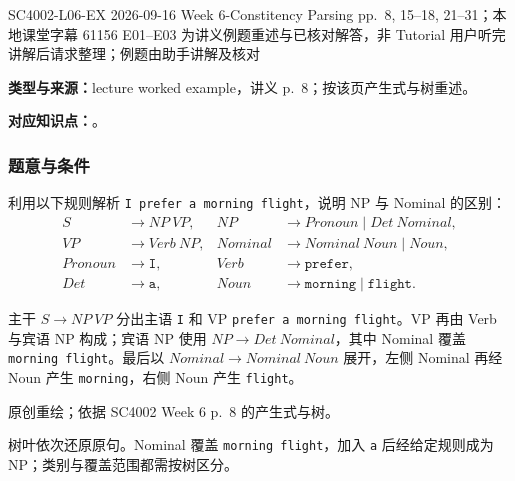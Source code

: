 

\examplemeta
  {SC4002-L06-EX}
  {2026-09-16}
  {Week 6-Constitency Parsing pp.~8, 15--18, 21--31；本地课堂字幕 61156}
  {E01--E03 为讲义例题重述与已核对解答，非 Tutorial}
  {用户听完讲解后请求整理；例题由助手讲解及核对}


\textbf{类型与来源：}lecture worked example，讲义 p.~8；按该页产生式与树重述。

\textbf{对应知识点：}。

\subsubsection*{题意与条件}

利用以下规则解析 \texttt{I prefer a morning flight}，说明 NP 与 Nominal 的区别：
\[
\begin{aligned}
  S&\rightarrow NP\ VP,& NP&\rightarrow Pronoun\mid Det\ Nominal,\\
  VP&\rightarrow Verb\ NP,& Nominal&\rightarrow Nominal\ Noun\mid Noun,\\
  Pronoun&\rightarrow\texttt{I},& Verb&\rightarrow\texttt{prefer},\\
  Det&\rightarrow\texttt{a},& Noun&\rightarrow\texttt{morning}\mid\texttt{flight}.
\end{aligned}
\]

\begin{workedsolution}
主干 $S\rightarrow NP\ VP$ 分出主语 \texttt{I} 和 VP \texttt{prefer a morning flight}。VP 再由 Verb 与宾语 NP 构成；宾语 NP 使用 $NP\rightarrow Det\ Nominal$，其中 Nominal 覆盖 \texttt{morning flight}。最后以 $Nominal\rightarrow Nominal\ Noun$ 展开，左侧 Nominal 再经 Noun 产生 \texttt{morning}，右侧 Noun 产生 \texttt{flight}。

\begin{center}
  

  {\small 原创重绘；依据 SC4002 Week 6 p.~8 的产生式与树。}
\end{center}

树叶依次还原原句。Nominal 覆盖 \texttt{morning flight}，加入 \texttt{a} 后经给定规则成为 NP；类别与覆盖范围都需按树区分。
\end{workedsolution}

